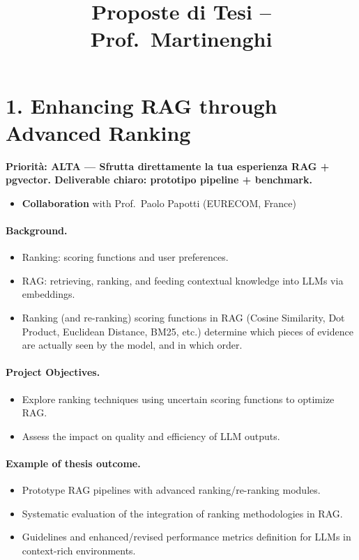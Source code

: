 \documentclass[a4paper,11pt]{article}
\title{\textbf{Proposte di Tesi -- Prof.\ Martinenghi}}
\author{}
\date{}
\newcommand{\priorita}[1]{%
  \par\smallskip\noindent\textbf{Priorit\`a: #1}\par\smallskip
}
\begin{document}
\maketitle
\thispagestyle{empty}

\section{1. Enhancing RAG through Advanced Ranking}

\priorita{ALTA --- Sfrutta direttamente la tua esperienza RAG + pgvector. Deliverable chiaro: prototipo pipeline + benchmark.}

\begin{itemize}[nosep]
  \item \textbf{Collaboration} with Prof.\ Paolo Papotti (EURECOM, France)
\end{itemize}

\paragraph{Background.}
\begin{itemize}[nosep]
  \item Ranking: scoring functions and user preferences.
  \item RAG\@: retrieving, ranking, and feeding contextual knowledge into LLMs via embeddings.
  \item Ranking (and re-ranking) scoring functions in RAG (Cosine Similarity, Dot Product, Euclidean Distance, BM25, etc.) determine which pieces of evidence are actually seen by the model, and in which order.
\end{itemize}

\paragraph{Project Objectives.}
\begin{itemize}[nosep]
  \item Explore ranking techniques using uncertain scoring functions to optimize RAG\@.
  \item Assess the impact on quality and efficiency of LLM outputs.
\end{itemize}

\paragraph{Example of thesis outcome.}
\begin{itemize}[nosep]
  \item Prototype RAG pipelines with advanced ranking/re-ranking modules.
  \item Systematic evaluation of the integration of ranking methodologies in RAG\@.
  \item Guidelines and enhanced/revised performance metrics definition for LLMs in context-rich environments.
\end{itemize}
\end{document}

